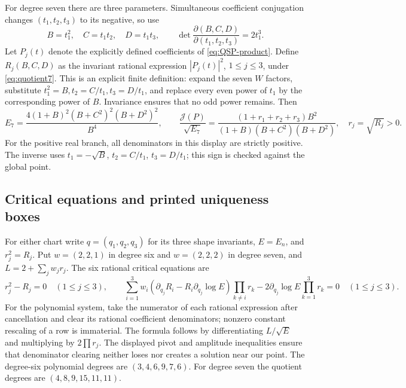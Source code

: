 \documentclass[11pt]{article}
\newcommand{\J}{\mathcal J}
\begin{document}
For degree seven there are three parameters. Simultaneous coefficient
conjugation changes $(t_1,t_2,t_3)$ to its negative, so use
\begin{equation}\label{eq:quotient7}
 B=t_1^2,\quad C=t_1t_2,\quad D=t_1t_3,\qquad
 \det\frac{\partial(B,C,D)}{\partial(t_1,t_2,t_3)}=2t_1^3.
\end{equation}
Let $P_j(t)$ denote the explicitly defined coefficients of
\eqref{eq:QSP-product}. Define $R_j(B,C,D)$ as the invariant rational
expression $|P_j(t)|^2$, $1\le j\le3$, under \eqref{eq:quotient7}.
This is an explicit finite definition: expand the seven $W$ factors,
substitute $t_1^2=B,t_2=C/t_1,t_3=D/t_1$, and replace every even power
of $t_1$ by the corresponding power of $B$. Invariance ensures that no
odd power remains. Then
\begin{equation}\label{eq:energy-target7}
 E_7=\frac{4(1+B)^2(B+C^2)^2(B+D^2)^2}{B^4},\qquad
 \frac{\J(P)}{\sqrt{E_7}}
 =\frac{(1+r_1+r_2+r_3)B^2}{(1+B)(B+C^2)(B+D^2)},\quad r_j=\sqrt{R_j}>0.
\end{equation}
For the positive real branch, all denominators in this display are
strictly positive. The inverse uses $t_1=-\sqrt B$, $t_2=C/t_1$,
$t_3=D/t_1$; this sign is checked against the global point.

\subsection{Critical equations and printed uniqueness boxes}\label{sec:criticalboxes}
For either chart write $q=(q_1,q_2,q_3)$ for its three shape invariants,
$E=E_n$, and $r_j^2=R_j$. Put $w=(2,2,1)$ in degree six and
$w=(2,2,2)$ in degree seven, and $L=2+\sum_jw_jr_j$.
The six rational critical equations are
\begin{equation}\label{eq:critical-system}
 r_j^2-R_j=0\quad(1\le j\le3),\qquad
 \sum_{i=1}^3w_i(\partial_{q_j}R_i-R_i\partial_{q_j}\log E)
                   \prod_{k\ne i}r_k
       -2\partial_{q_j}\log E\prod_{k=1}^3r_k=0\quad(1\le j\le3).
\end{equation}
For the polynomial system, take the numerator of each rational
expression after cancellation and clear its rational coefficient
denominators; nonzero constant rescaling of a row is immaterial.
The formula
follows by differentiating $L/\sqrt E$ and multiplying by
$2\prod r_j$. The displayed pivot and amplitude inequalities ensure that
denominator clearing neither loses nor creates a solution near our point.
The degree-six polynomial degrees are $(3,4,6,9,7,6)$.
For degree seven the quotient degrees are $(4,8,9,15,11,11)$.
\end{document}
